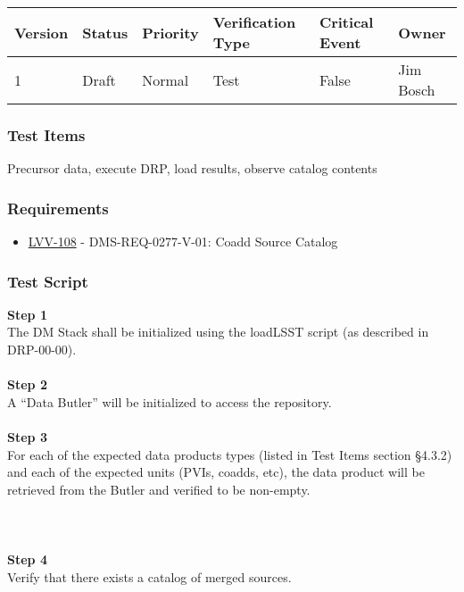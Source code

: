 \begin{longtable}[]{@{}llllll@{}}
\toprule
Version & Status & Priority & Verification Type & Critical Event &
Owner\tabularnewline
\midrule
\endhead
1 & Draft & Normal & Test & False & Jim Bosch\tabularnewline
\bottomrule
\end{longtable}

\hypertarget{test-items-46}{%
\subsubsection{Test Items}\label{test-items-46}}

Precursor data, execute DRP, load results, observe catalog contents

\hypertarget{requirements-47}{%
\subsubsection{Requirements}\label{requirements-47}}

\begin{itemize}
\tightlist
\item
  \href{https://jira.lsstcorp.org/browse/LVV-108}{LVV-108} -
  DMS-REQ-0277-V-01: Coadd Source Catalog
\end{itemize}

\hypertarget{test-script-47}{%
\subsubsection{Test Script}\label{test-script-47}}

\textbf{Step 1}\\
The DM Stack shall be initialized using the loadLSST script (as
described in DRP-00-00).\\
~\\
\textbf{Step 2}\\
A ``Data Butler'' will be initialized to access the repository.\\
~\\
\textbf{Step 3}\\
For each of the expected data products types (listed in Test Items
section §4.3.2) and each of the expected units (PVIs, coadds, etc), the
data product will be retrieved from the Butler and verified to be
non-empty.\\
~\\
~\\
~\\
\textbf{Step 4}\\
Verify that there exists a catalog of merged sources.\\
~\\

